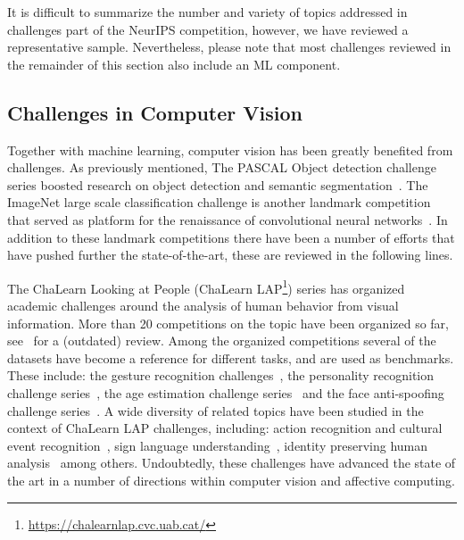 \documentclass[twoside,11pt]{article}
\begin{document}
It is difficult to summarize the number and variety of topics addressed in challenges part of the NeurIPS competition, however, we have reviewed a representative sample. Nevertheless, please note that most challenges reviewed in the remainder of this section also  include an ML component. 

\subsection{Challenges in Computer Vision}
Together with machine learning, computer vision has been greatly benefited from challenges. As previously mentioned, The PASCAL Object detection challenge series boosted research on object detection and semantic segmentation~\citep{Everingham15}. The ImageNet large scale classification challenge is another landmark competition that served as platform for the renaissance of convolutional neural networks~\citep{Russakovsky2015}. In addition to these landmark competitions there have been a number of  efforts that have pushed further the state-of-the-art, these are reviewed in the following lines. 


The ChaLearn Looking at People (ChaLearn LAP\footnote{\url{https://chalearnlap.cvc.uab.cat/}}) series has organized academic challenges around the  analysis of human behavior from visual information. More than 20 competitions on the topic have been organized so far, see~\citep{DBLP:conf/ijcnn/EscaleraBEG17} for a (outdated) review.  Among the organized competitions several of the datasets have become a reference for different tasks, and are used as benchmarks. These include: the gesture recognition challenges~\citep{DBLP:conf/icmi/EscaleraGBRLGAE13,DBLP:conf/eccv/EscaleraBGBMRPE14, DBLP:books/sp/EGA2017,DBLP:conf/iccvw/WanEAEBGMAGLX17}, the personality recognition challenge series~\citep{DBLP:conf/ijcnn/EscalanteGEJMBA17,DBLP:journals/taffco/EscalanteKSEGGB22,DBLP:conf/iccv/PalmeroBJCNCSSZ21}, the age estimation challenge series~\citep{DBLP:conf/iccvw/EscaleraFPBGEMS15,DBLP:conf/cvpr/EscaleraTMBEGTC16} and the face anti-spoofing challenge series~\citep{DBLP:conf/cvpr/Liu0EETYWLGGL19,DBLP:series/synthesis/2020Wan,DBLP:journals/iet-bmt/LiuL0LEEM0WYTYY21}. A wide diversity of related topics have been studied in the context of ChaLearn LAP challenges, including: action recognition and cultural event recognition~\citep{DBLP:conf/cvpr/BaroGFBOEGE15,DBLP:conf/iccvw/EscaleraFPBGEMS15}, sign language understanding~\citep{DBLP:conf/cvpr/SincanJEK21}, identity preserving human analysis~\citep{DBLP:conf/fgr/ClapesJME20} among others. Undoubtedly, these challenges have advanced the state of the art in a number of directions within computer vision and affective computing. 
\end{document}
